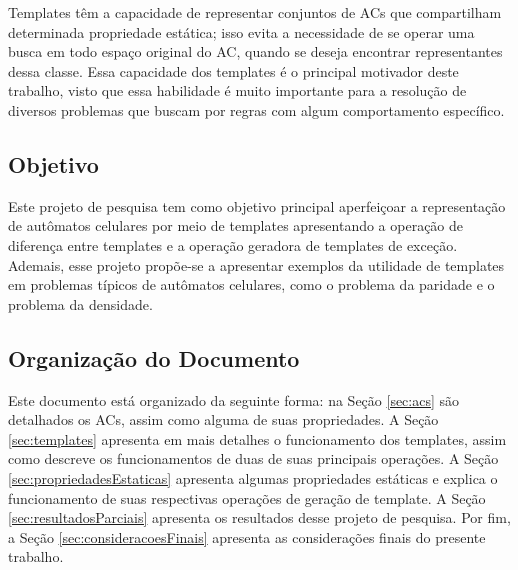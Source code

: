 Templates têm a capacidade de representar conjuntos de ACs que compartilham determinada propriedade estática; isso evita a necessidade de se operar uma busca em todo espaço original do AC, quando se deseja encontrar representantes dessa classe. Essa capacidade dos templates é o principal motivador deste trabalho, visto que essa habilidade é muito importante para a resolução de diversos problemas que buscam por regras com algum comportamento específico.

\subsection{Objetivo}%
Este projeto de pesquisa tem como objetivo principal aperfeiçoar a representação de autômatos celulares por meio de templates apresentando a operação de diferença entre templates e a operação geradora de templates de exceção. Ademais, esse projeto propõe-se a apresentar exemplos da utilidade de templates em problemas típicos de autômatos celulares, como o problema da paridade e o problema da densidade.

\subsection{Organização do Documento}
Este documento está organizado da seguinte forma: na Seção \ref{sec:acs} são detalhados os ACs, assim como alguma de suas propriedades. A Seção \ref{sec:templates} apresenta em mais detalhes o funcionamento dos templates, assim como descreve os funcionamentos de duas de suas principais operações. A Seção \ref{sec:propriedadesEstaticas} apresenta algumas propriedades estáticas e explica o funcionamento de suas respectivas operações de geração de template. A Seção \ref{sec:resultadosParciais} apresenta os resultados desse projeto de pesquisa. Por fim, a Seção \ref{sec:consideracoesFinais} apresenta as considerações finais do presente trabalho.